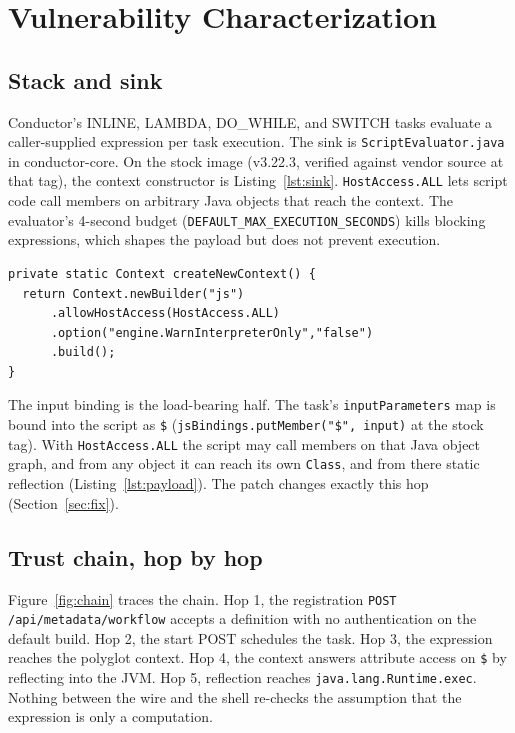 \documentclass[journal]{IEEEtran}
\begin{document}
\section{Vulnerability Characterization}
\label{sec:vuln}

\subsection{Stack and sink}

Conductor's INLINE, LAMBDA, DO\_WHILE, and SWITCH tasks evaluate a
caller-supplied expression per task execution. The sink is
\texttt{ScriptEvaluator.java} in conductor-core. On the stock image (v3.22.3,
verified against vendor source at that tag), the context constructor is
Listing~\ref{lst:sink}. \texttt{HostAccess.ALL} lets script code call members
on arbitrary Java objects that reach the context. The evaluator's 4-second
budget (\texttt{DEFAULT\_MAX\_EXECUTION\_SECONDS}) kills blocking expressions,
which shapes the payload but does not prevent execution.

\begin{lstlisting}[style=java,caption={Sink shape at v3.22.3
(\texttt{createNewContext()}, ScriptEvaluator.java lines 116 to 120, vendor
source at the tag).},label={lst:sink}]
private static Context createNewContext() {
  return Context.newBuilder("js")
      .allowHostAccess(HostAccess.ALL)
      .option("engine.WarnInterpreterOnly","false")
      .build();
}
\end{lstlisting}

The input binding is the load-bearing half. The task's
\texttt{inputParameters} map is bound into the script as \texttt{\$}
(\texttt{jsBindings.putMember("\$", input)} at the stock tag). With
\texttt{HostAccess.ALL} the script may call members on that Java object graph,
and from any object it can reach its own \texttt{Class}, and from there static
reflection (Listing~\ref{lst:payload}). The patch changes exactly this hop
(Section~\ref{sec:fix}).

\subsection{Trust chain, hop by hop}

Figure~\ref{fig:chain} traces the chain. Hop 1, the registration
\texttt{POST\allowbreak{} /api/metadata/workflow} accepts a definition with no
authentication on the default build. Hop 2, the start POST schedules the task.
Hop 3, the expression reaches the polyglot context. Hop 4, the context answers
attribute access on \texttt{\$} by reflecting into the JVM. Hop 5, reflection
reaches \texttt{java.lang.Runtime.exec}. Nothing between the wire and the
shell re-checks the assumption that the expression is only a computation.
\end{document}
